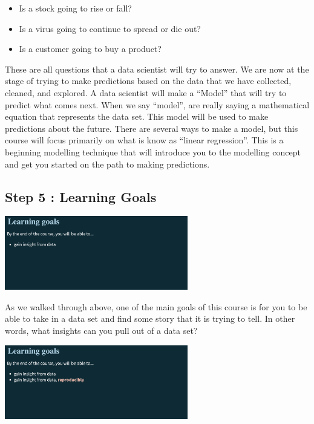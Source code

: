 \documentclass[
  letterpaper,
  DIV=11,
  numbers=noendperiod]{scrreprt}
\providecommand{\tightlist}{%
  \setlength{\itemsep}{0pt}\setlength{\parskip}{0pt}}\usepackage{longtable,booktabs,array}
\begin{document}
\begin{itemize}
\tightlist
\item
  Is a stock going to rise or fall?
\item
  Is a virus going to continue to spread or die out?
\item
  Is a customer going to buy a product?
\end{itemize}

These are all questions that a data scientist will try to answer. We are
now at the stage of trying to make predictions based on the data that we
have collected, cleaned, and explored. A data scientist will make a
``Model'' that will try to predict what comes next. When we say
``model'', are really saying a mathematical equation that represents the
data set. This model will be used to make predictions about the future.
There are several ways to make a model, but this course will focus
primarily on what is know as ``linear regression''. This is a beginning
modelling technique that will introduce you to the modelling concept and
get you started on the path to making predictions.

\subsection*{Step 5 : Learning Goals}\label{step-5-learning-goals}

\includegraphics[width=0.6\textwidth,height=\textheight]{./images/WIDS-8.jpg}

As we walked through above, one of the main goals of this course is for
you to be able to take in a data set and find some story that it is
trying to tell. In other words, what insights can you pull out of a data
set?

\includegraphics[width=0.6\textwidth,height=\textheight]{./images/WIDS-9.jpg}
\end{document}
